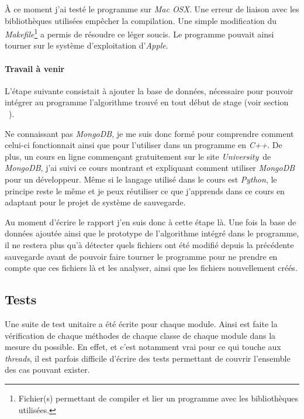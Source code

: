 \documentclass[a4paper,10pt, twoside]{report}
\begin{document}
\begin{spacing}{1.2}
\`A ce moment j'ai test\'e le programme sur \textit{Mac OSX}. Une erreur de
liaison avec les biblioth\`eques utilis\'ees emp\^echer la compilation. Une
simple modification du \textit{Makefile}\footnote{Fichier(s) permettant de
compiler et lier un programme avec les biblioth\`eques utilis\'ees.} a permis
de r\'esoudre ce l\'eger soucis. Le programme pouvait ainsi tourner sur le
syst\`eme d'exploitation d'\textit{Apple}.

\paragraph{Travail \`a venir}

L'\'etape suivante consistait \`a ajouter la base de donn\'ees, n\'ecessaire
pour pouvoir int\'egrer au programme l'algorithme trouv\'e en tout d\'ebut de
stage (voir section \flqq~\frqq).

Ne connaissant pas \textit{MongoDB}, je me suis donc form\'e pour comprendre
comment celui-ci fonctionnait ainsi que pour l'utiliser dans un programme en
\textit{C++}. De plus, un cours en ligne commen\c{c}ant gratuitement sur le site
\flqq\textit{University}\frqq~de \textit{MongoDB}\cite{refMongoDBUniversity},
j'ai suivi ce cours montrant et expliquant comment utiliser \textit{MongoDB}
pour un d\'eveloppeur. M\^eme si le langage utilis\'e dans le cours est
\textit{Python}, le principe reste le m\^eme et je peux r\'eutiliser ce que
j'apprends dans ce cours en adaptant pour le projet de syst\`eme de sauvegarde.

Au moment d'\'ecrire le rapport j'en suis donc \`a cette \'etape l\`a. Une fois
la base de donn\'ees ajout\'ee ainsi que le prototype de l'algorithme
int\'egr\'e dans le programme, il ne restera plus qu'\`a d\'etecter quels
fichiers ont \'et\'e modifi\'e depuis la pr\'ec\'edente sauvegarde avant de
pouvoir faire tourner le programme pour ne prendre en compte que ces fichiers
l\`a et les analyser, ainsi que les fichiers nouvellement cr\'e\'es.

\subsection{Tests}
Une suite de test unitaire a \'et\'e \'ecrite pour chaque module. Ainsi est
faite la v\'erification de chaque m\'ethodes de chaque classe de chaque module
dans la mesure du possible. En effet, et c'est notamment vrai pour ce qui touche
aux \textit{threads}, il est parfois difficile d'\'ecrire des tests permettant
de couvrir l'ensemble des cas pouvant exister.


\end{spacing}
\end{document}
